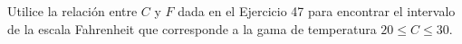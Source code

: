 \item Utilice la relación entre $C$ y $F$ dada en el Ejercicio 47 para encontrar el intervalo de la escala Fahrenheit que corresponde a la gama de temperatura $20 \le C \le 30$.
